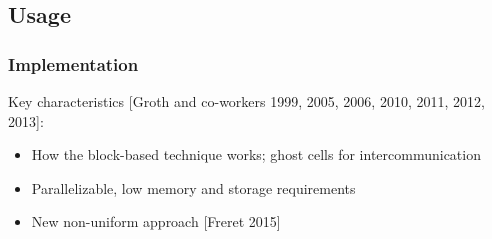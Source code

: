 \documentclass{beamer}
\begin{document}
\subsection{Usage}
\begin{frame}%
\frametitle{Implementation}
\tiny
\begin{minipage}[t][1\textheight]{1\textwidth}
\vspace{-15pt}
\begin{exampleblock}{Key characteristics}
[Groth and co-workers 1999, 2005, 2006, 2010, 2011, 2012, 2013]:
\begin{itemize}
\tiny
\item How the block-based technique works; ghost cells for intercommunication 
\item Parallelizable, low memory and storage requirements
\item New non-uniform approach [Freret 2015]
\end{itemize}


\end{exampleblock}
\end{minipage}
\end{frame}
\end{document}
